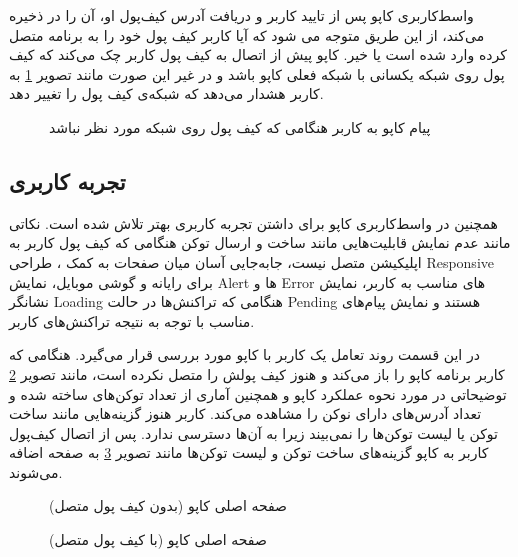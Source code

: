 واسط‌کاربری کاپو پس از تایید کاربر و دریافت آدرس کیف‌پول او، آن را در
ذخیره می‌کند،
از این طریق متوجه می شود که آیا کاربر کیف پول خود را به برنامه متصل کرده وارد شده است یا خیر.
کاپو پیش از اتصال به کیف پول کاربر چک می‌کند که کیف پول روی شبکه یکسانی با شبکه فعلی کاپو باشد
و در غیر این صورت مانند تصویر
\ref{fig:cappu-wrong-network-error}
به کاربر هشدار می‌دهد که شبکه‌ی کیف پول را تغییر دهد.

\begin{figure}[H]
\centerline{}
\caption{پیام کاپو به کاربر هنگامی که کیف پول روی شبکه مورد نظر نباشد}
\label{fig:cappu-wrong-network-error}
\end{figure}

\subsection{تجربه کاربری}
همچنین در واسط‌کاربری کاپو برای داشتن تجربه کاربری بهتر تلاش شده است.
نکاتی مانند عدم نمایش قابلیت‌هایی مانند ساخت و ارسال توکن هنگامی که کیف پول کاربر به اپلیکیشن متصل نیست،
جابه‌جایی آسان میان صفحات به کمک
، طراحی
\gls{Responsive}
برای رایانه و گوشی موبایل، نمایش
\gls{Alert}
ها و
\gls{Error}
های مناسب به کاربر، نمایش نشانگر
\gls{Loading}
هنگامی که تراکنش‌ها در حالت
\gls{Pending}
هستند و نمایش پیام‌های مناسب با توجه به نتیجه تراکنش‌های کاربر.

در این قسمت روند تعامل یک کاربر با کاپو مورد بررسی قرار می‌گیرد.
هنگامی که کاربر برنامه کاپو را باز می‌کند و هنوز کیف پولش را متصل نکرده است،
مانند تصویر
\ref{fig:homepage-not-loggedin}
توضیحاتی در مورد نحوه عملکرد کاپو
و همچنین آماری از تعداد توکن‌های ساخته شده و تعداد آدرس‌های دارای نوکن را مشاهده می‌کند.
کاربر هنوز گزینه‌هایی مانند ساخت توکن یا لیست توکن‌ها را نمی‌بیند زیرا به آن‌ها دسترسی ندارد.
پس از اتصال کیف‌پول کاربر  به کاپو گزینه‌های ساخت توکن و لیست توکن‌ها مانند تصویر
\ref{fig:homepage-loggedin}
به صفحه اضافه می‌شوند.

\begin{figure}
\centerline{}
\caption{صفحه اصلی کاپو (بدون کیف پول متصل)}
\label{fig:homepage-not-loggedin}
\end{figure}

\begin{figure}
\centerline{}
\caption{صفحه اصلی کاپو (با کیف پول متصل)}
\label{fig:homepage-loggedin}
\end{figure}

